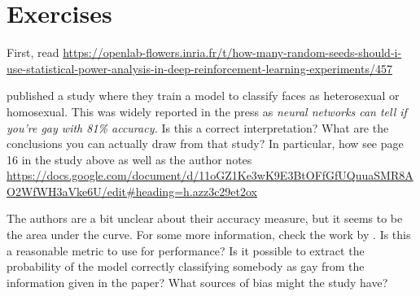 \section{Exercises}

First, read \url{https://openlab-flowers.inria.fr/t/how-many-random-seeds-should-i-use-statistical-power-analysis-in-deep-reinforcement-learning-experiments/457}

\citet{wang2017deep} published a study where they train a model to classify faces as heterosexual or homosexual. This was widely reported in the press as \emph{neural networks can tell if you're gay with 81\% accuracy.} Is this a correct interpretation? What are the conclusions you can actually draw from that study? In particular, how see page 16 in the study above as well as the author notes \url{https://docs.google.com/document/d/11oGZ1Ke3wK9E3BtOFfGfUQuuaSMR8AO2WfWH3aVke6U/edit#heading=h.azz3c29et2ox}

The authors are a bit unclear about their accuracy measure, but it
seems to be the area under the curve. For some more information, check
the work by \citet{bengio2005expected}. Is this a reasonable metric to
use for performance? Is it possible to extract the probability of the
model correctly classifying somebody as gay from the information given
in the paper?  What sources of bias might the study have?

